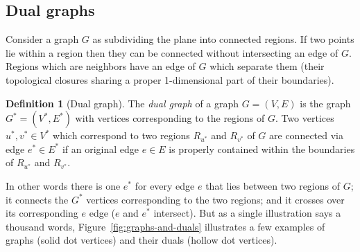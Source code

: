 \documentclass{amsart}
\theoremstyle{plain}
\theoremstyle{remark}
\theoremstyle{definition}
\newtheorem*{definition*}{Definition}
\newenvironment{definition}%
  {\begin{leftbar}\begin{definition*}
}{%
  \end{definition*}\end{leftbar}
}
\begin{document}
\subsection{Dual graphs}

Consider a graph $G$ as subdividing the plane into connected regions. If two
points lie within a region then they can be connected without intersecting an
edge of $G$. Regions which are neighbors have an edge of $G$ which separate them
(their topological closures sharing a proper 1-dimensional part of their
boundaries).
\begin{definition}[Dual graph]
  The \emph{dual graph} of a graph $G=(V,E)$ is the graph $G^*=(V^*,E^*)$ with
  vertices corresponding to the regions of $G$.
  Two vertices $u^*,v^*\in V^*$
  which correspond to two regions $R_{u^*}$ and $R_{v^*}$ of $G$ are connected via edge $e^*\in
  E^*$ if an original edge $e\in E$ is properly contained within the boundaries
  of $R_{u^*}$ and $R_{v^*}$.
\end{definition}
In other words there is one $e^*$ for
every edge $e$ that lies between two regions of $G$; it connects the $G^*$
vertices corresponding to the two regions; and it crosses over its
corresponding $e$ edge ($e$ and $e^*$ intersect).
%
But as a single illustration says a thousand words,
Figure~\ref{fig:graphs-and-duals} illustrates a few examples of graphs
(solid dot vertices) and their duals (hollow dot vertices).
\end{document}
